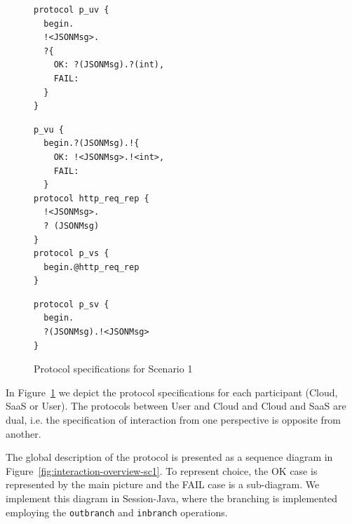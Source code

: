 \documentclass[10pt]{llncs}
\begin{document}
%
{
\lstset{
  framerule=0pt,
  numbers=none,
  basicstyle=\ttfamily\scriptsize,
}
\renewcommand\lstlistingname{Protocol}
\begin{figure}

\begin{minipage}[t]{0.30\textwidth}
\begin{lstlisting}[caption=User]
protocol p_uv { 
  begin.
  !<JSONMsg>. 
  ?{
    OK: ?(JSONMsg).?(int),
    FAIL: 
  }
}
\end{lstlisting}
\end{minipage}
\begin{minipage}[t]{0.35\textwidth}
\begin{lstlisting}[caption=Cloud]
p_vu { 
  begin.?(JSONMsg).!{
    OK: !<JSONMsg>.!<int>,
    FAIL: 
  }
protocol http_req_rep {
  !<JSONMsg>.
  ? (JSONMsg)
}
protocol p_vs { 
  begin.@http_req_rep 
}
\end{lstlisting}
\end{minipage}
\begin{minipage}[t]{0.30\textwidth}
\begin{lstlisting}[caption=SaaS]
protocol p_sv { 
  begin.
  ?(JSONMsg).!<JSONMsg> 
}
\end{lstlisting}
\end{minipage}
\caption{Protocol specifications for Scenario 1}\label{fig:protocols-sc1} 
\end{figure}

In Figure~\ref{fig:protocols-sc1} we depict the protocol specifications for each participant (Cloud, SaaS or User).
The protocols between User and Cloud and Cloud and SaaS are dual, i.e. the specification of interaction from one perspective is opposite from another.

}


The global description of the protocol is presented as a sequence diagram in Figure~\ref{fig:interaction-overview-sc1}. %
To represent choice, the OK case is represented by the main picture and the FAIL case is a sub-diagram.
We implement this diagram in Session-Java, where the branching is implemented employing the \texttt{outbranch} and \texttt{inbranch} operations.
\end{document}
